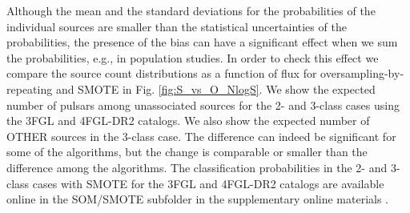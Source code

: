 Although the mean and the standard deviations for the probabilities of the individual sources are smaller than the 
statistical uncertainties of the probabilities, the presence of the bias can have a significant effect when we sum the probabilities, e.g., in population studies.
In order to check this effect we compare the source count distributions as a function of flux for oversampling-by-repeating and SMOTE 
in Fig. \ref{fig:S_vs_O_NlogS}.
We show the expected number of pulsars among unassociated sources for the 2- and 3-class cases using the 3FGL and 4FGL-DR2 catalogs.
We also show the expected number of OTHER sources in the 3-class case.
The difference can indeed be significant for some of the algorithms, but the change is comparable or smaller than the difference among the algorithms.
The classification probabilities in the 2- and 3-class cases with SMOTE for the 3FGL and 4FGL-DR2 catalogs 
are available online in the SOM/SMOTE subfolder in the supplementary online materials \citep{SOM_material}.

